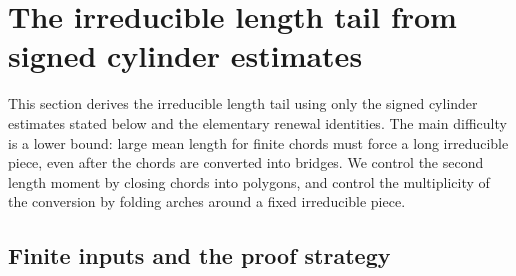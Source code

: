 \section{The irreducible length tail from signed cylinder estimates}
\label{R:alt:j}

This section derives the irreducible length tail using only the signed
cylinder estimates stated below and the elementary renewal identities.
The main difficulty is a lower bound: large mean length for finite chords
must force a long irreducible piece, even after the chords are converted
into bridges. We control the second length moment by closing chords into
polygons, and control the multiplicity of the conversion by folding arches
around a fixed irreducible piece.

\subsection{Finite inputs and the proof strategy}

